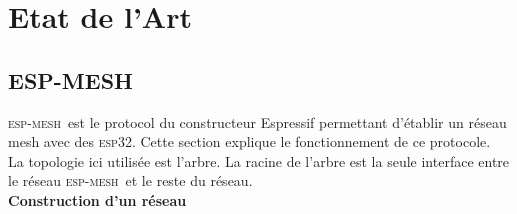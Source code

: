 \documentclass[a4paper, 12pt]{report}
\newcommand{\esp}{\textsc{esp32}}
\newcommand{\espmesh}{\textsc{esp-mesh}}
\begin{document}
\chapter{Etat de l'Art}

\section{ESP-MESH}
    \espmesh\ est le protocol du constructeur Espressif permettant d'établir un réseau mesh avec des \esp.
    Cette section explique le fonctionnement de ce protocole.\\
    La topologie ici utilisée est l'arbre. La racine de l'arbre est la seule interface entre le
    réseau \espmesh\ et le reste du réseau.\\

    \textbf{Construction d'un réseau}
    \newline
\end{document}
